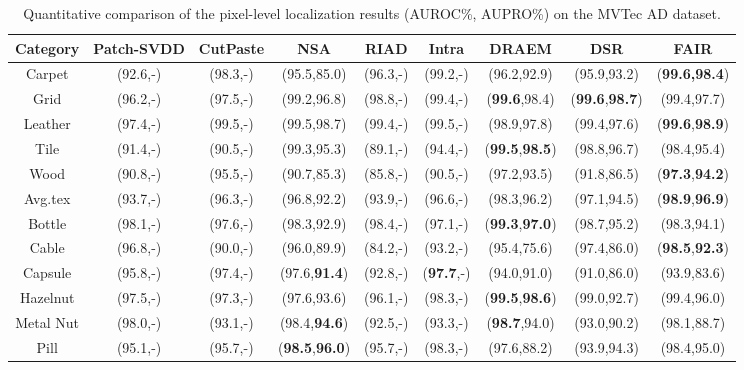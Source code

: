 \documentclass[5p, twocolumn]{elsarticle}[draft]
\begin{document}
\begin{table*}[h]
\centering
\footnotesize
\caption{Quantitative comparison of the pixel-level localization results (AUROC\%, AUPRO\%) on the MVTec AD dataset.}
\label{Visa_image}
\begin{tabular}{ccccccccc}
\hline
Category & Patch-SVDD \cite{yi2020patch} & CutPaste \cite{li2021cutpaste} & NSA \cite{schluter2022natural} & RIAD \cite{zavrtanik2021reconstruction} & Intra \cite{pirnay2022inpainting} & DRAEM \cite{zavrtanik2021draem} & DSR \cite{zavrtanik2022dsr} & FAIR \\ \hline
Carpet & (92.6,-) & (98.3,-) & (95.5,85.0) & (96.3,-) & (99.2,-) & (96.2,92.9) & (95.9,93.2) & (\textbf{99.6,98.4}) \\
Grid & (96.2,-) & (97.5,-) & (99.2,96.8) & (98.8,-) & (99.4,-) & (\textbf{99.6},98.4) & (\textbf{99.6},\textbf{98.7}) & (99.4,97.7) \\
Leather & (97.4,-) & (99.5,-) & (99.5,98.7) & (99.4,-) & (99.5,-) & (98.9,97.8) & (99.4,97.6) & (\textbf{99.6},\textbf{98.9}) \\
Tile & (91.4,-) & (90.5,-) & (99.3,95.3) & (89.1,-) & (94.4,-) & (\textbf{99.5},\textbf{98.5}) & (98.8,96.7) & (98.4,95.4) \\
Wood & (90.8,-) & (95.5,-) & (90.7,85.3) & (85.8,-) & (90.5,-) & (97.2,93.5) & (91.8,86.5) & (\textbf{97.3},\textbf{94.2}) \\ \hline
Avg.tex & (93.7,-) & (96.3,-) & (96.8,92.2) & (93.9,-) & (96.6,-) & (98.3,96.2) & (97.1,94.5) & (\textbf{98.9},\textbf{96.9}) \\ \hline
Bottle & (98.1,-) & (97.6,-) & (98.3,92.9) & (98.4,-) & (97.1,-) & (\textbf{99.3},\textbf{97.0}) & (98.7,95.2) & (98.3,94.1) \\
Cable & (96.8,-) & (90.0,-) & (96.0,89.9) & (84.2,-) & (93.2,-) & (95.4,75.6) & (97.4,86.0) & (\textbf{98.5},\textbf{92.3}) \\
Capsule & (95.8,-) & (97.4,-) & (97.6,\textbf{91.4}) & (92.8,-) & (\textbf{97.7},-) & (94.0,91.0) & (91.0,86.0) & (93.9,83.6) \\
Hazelnut & (97.5,-) & (97.3,-) & (97.6,93.6) & (96.1,-) & (98.3,-) & (\textbf{99.5},\textbf{98.6}) & (99.0,92.7) & (99.4,96.0) \\
Metal Nut & (98.0,-) & (93.1,-) & (98.4,\textbf{94.6}) & (92.5,-) & (93.3,-) & (\textbf{98.7},94.0) & (93.0,90.2) & (98.1,88.7) \\
Pill & (95.1,-) & (95.7,-) & (\textbf{98.5},\textbf{96.0}) & (95.7,-) & (98.3,-) & (97.6,88.2) & (93.9,94.3) & (98.4,95.0) \\

\end{tabular}
\end{table*}
\end{document}
